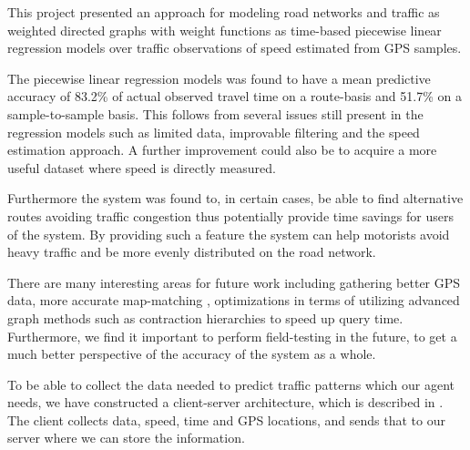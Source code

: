 This project presented an approach for modeling road networks and traffic as weighted directed graphs with weight functions as time-based piecewise linear regression models over traffic observations of speed estimated from GPS samples.

The piecewise linear regression models was found to have a mean predictive accuracy of 83.2\% of actual observed travel time on a route-basis and 51.7\% on a sample-to-sample basis. This follows from several issues still present in the regression models such as limited data, improvable filtering and the speed estimation approach. A further improvement could also be to acquire a more useful dataset where speed is directly measured.

Furthermore the system was found to, in certain cases, be able to find alternative routes avoiding traffic congestion thus potentially provide time savings for users of the system. By providing such a feature the system can help motorists avoid heavy traffic and be more evenly distributed on the road network.

There are many interesting areas for future work including gathering better GPS data, more accurate map-matching , optimizations in terms of utilizing advanced graph methods such as contraction hierarchies to speed up query time. Furthermore, we find it important to perform field-testing in the future, to get a much better perspective of the accuracy of the system as a whole.

To be able to collect the data needed to predict traffic patterns which our agent needs, we have constructed a client-server architecture, which is described in . The client collects data, speed, time and GPS locations, and sends that to our server where we can store the information.